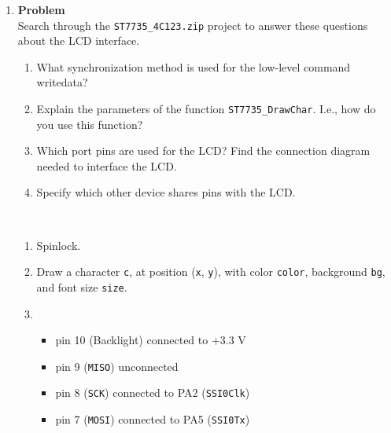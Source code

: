 \documentclass[12pt]{article}
\newenvironment{Ex}{\textbf{Problem}\vspace{.75em}\\}{}
\begin{document}
\begin{enumerate}
\begin{Ex}
\begin{solution}
\begin{enumerate}
      \item The vector table exists in \verb|startup.s|. The system
        finds the named function and calls that function when the
        interrupt is received.
      \item The acknowledgment occurs by setting a bit in a
        memory-mapped hardware register. For this device, bit 6 is set
        to acknowledge the interrupt.
      \item The TM4C is like a PC. It has two 16-byte FIFOs (one for
        transmit, one for receive).
      \end{enumerate}
    \end{solution}
  \end{Ex}
\item
  \begin{Ex}
    Search through the \verb|ST7735_4C123.zip| project to answer these
    questions about the LCD interface.
    \begin{enumerate}
    \item What synchronization method is used for the low-level
      command writedata?
    \item Explain the parameters of the function
      \verb|ST7735_DrawChar|. I.e., how do you use this function?
    \item Which port pins are used for the LCD? Find the connection
      diagram needed to interface the LCD.
    \item Specify which other device shares pins with the LCD.
    \end{enumerate}
    \begin{solution} \hfill \vspace{.75em} \\
      \begin{enumerate}
      \item Spinlock.
      \item Draw a character \verb|c|, at position (\verb|x|,
        \verb|y|), with color \verb|color|, background \verb|bg|, and
        font size \verb|size|.
      \item
        \begin{itemize}
        \item pin 10 (Backlight) connected to +3.3 V
        \item pin 9 (\verb|MISO|) unconnected
        \item pin 8 (\verb|SCK|) connected to PA2 (\verb|SSI0Clk|)
        \item pin 7 (\verb|MOSI|) connected to PA5 (\verb|SSI0Tx|)

\end{itemize}
\end{enumerate}
\end{solution}
\end{Ex}
\end{enumerate}
\end{document}
